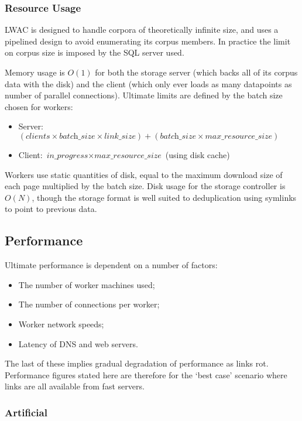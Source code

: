 \subsubsection{Resource Usage}

LWAC is designed to handle corpora of theoretically infinite size, and uses a pipelined design to avoid enumerating its corpus members.  In practice the limit on corpus size is imposed by the SQL server used.

Memory usage is $O(1)$ for both the storage server (which backs all of its corpus data with the disk) and the client (which only ever loads as many datapoints as number of parallel connections).  Ultimate limits are defined by the batch size chosen for workers:

\begin{itemize}
    \item Server: $(\textit{clients} \times \textit{batch\_size} \times \textit{link\_size}) + (\textit{batch\_size} \times \textit{max\_resource\_size})$
    \item Client: $\textit{in\_progress} \times \textit{max\_resource\_size}$ (using disk cache)
\end{itemize}

Workers use static quantities of disk, equal to the maximum download size of each page multiplied by the batch size.  Disk usage for the storage controller is $O(N)$,  though the storage format is well suited to deduplication using symlinks to point to previous data.


\subsection{Performance}
Ultimate performance is dependent on a number of factors:

\begin{itemize}
    \item The number of worker machines used;
    \item The number of connections per worker;
    \item Worker network speeds;
    \item Latency of DNS and web servers.
\end{itemize}

The last of these implies gradual degradation of performance as links rot.  Performance figures stated here are therefore for the `best case' scenario where links are all available from fast servers.


\subsubsection{Artificial}


